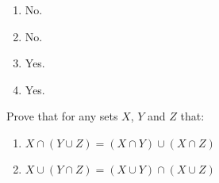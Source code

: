 \begin{exercises}
\begin{problist}
		\begin{solution}
            \begin{enumerate}
    		    \item No.
    		    \item No.
    		    \item Yes.
    		    \item Yes.
		    \end{enumerate}
		\end{solution}
		\prob
			Prove that for any sets $X$, $Y$ and $Z$ that:
			\begin{enumerate}
				\item $X \cap (Y \cup Z) = (X\cap Y) \cup (X\cap Z)$
				\item $X \cup (Y \cap Z) = (X\cup Y) \cap (X\cup Z)$
			\end{enumerate}
	\end{problist}
\end{exercises}
